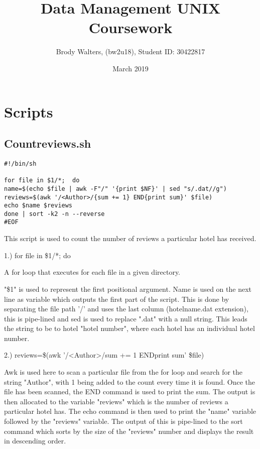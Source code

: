 \documentclass{article}
\title{Data Management UNIX Coursework}
\author{Brody Walters, (bw2u18), Student ID: 30422817}
\date{March 2019}
\begin{document}
\maketitle

\newpage

\maketitle

\section{Scripts}

\subsection{Countreviews.sh}


\begin{lstlisting}
#!/bin/sh

for file in $1/*;  do
name=$(echo $file | awk -F"/" '{print $NF}' | sed "s/.dat//g")
reviews=$(awk '/<Author>/{sum += 1} END{print sum}' $file)
echo $name $reviews
done | sort -k2 -n --reverse
#EOF

\end{lstlisting}

This script is used to count the number of reviews a particular hotel
has received.
\newline

1.) for file in \$1/*; do
\newline

A for loop that executes for each file in a given directory.

"\$1" is used to represent the first positional argument. Name is
used on the next line as variable which outputs the first
part of the script. This is done by separating the file path '/' 
and uses the last column
(hotelname.dat extension), this is pipe-lined and sed is used to
replace ".dat" with a null string.
This leads the string to be to hotel "hotel number", where each hotel
has an individual hotel number.
\newline

2.) reviews=\$(awk '/<Author>/{sum += 1} END{print sum}' \$file)
\newline

Awk is used here to scan a particular file from the for loop
and search for the string "Author", with 1 being added to the count
every time it is found. Once the file has been scanned, the END
command is used to print the sum. The output is then allocated to
the variable "reviews" which is the number of reviews a particular
hotel has.
The echo command is then used to print the "name" variable followed by
the "reviews" variable. The output of this is pipe-lined to the sort
command which sorts by the size of the "reviews" number and displays the
result in descending order.
\end{document}

